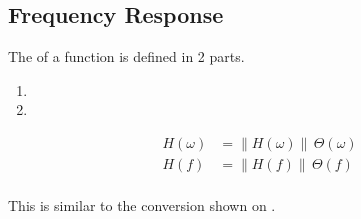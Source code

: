 \subsection{Frequency Response}\label{subsec:Fourier_Frequency_Response}
The  of a function is defined in 2 parts.
\begin{enumerate}[noitemsep]
\item {}
\item {}
\end{enumerate}
\begin{equation}\label{eq:Fourier_Frequency_Response}
  \begin{aligned}
    H(\omega) &= \lVert H(\omega) \rVert \, \Theta(\omega) \\
    H(f) &= \lVert H(f) \rVert \, \Theta(f) \\
  \end{aligned}
\end{equation}

\begin{remark*}
  This is similar to the  conversion shown on .
\end{remark*}


